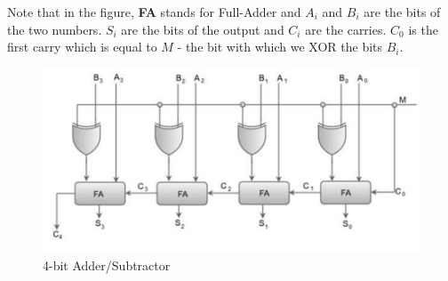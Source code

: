\documentclass[a4paper, titlepage]{article}
\begin{document}
Note that in the figure, \textbf{FA} stands for Full-Adder and $A_i$ and $B_i$ are the bits of the 
two numbers. $S_i$ are the bits of the output and $C_i$ are the carries. $C_0$ is the first carry 
which is equal to $M$ - the bit with which we XOR the bits $B_i$.
\begin{figure}[htp]
    \centering
    \hypertarget{4AS}{\includegraphics[scale = 0.6]{Image_4-bit_Add-Sub.png}}
    \caption{4-bit Adder/Subtractor}
    \label{fig:fig2}
\end{figure}
\end{document}
